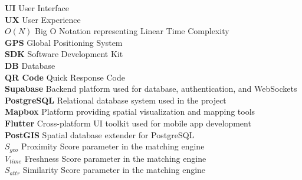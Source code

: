 \documentclass[12pt,a4paper]{report}
\begin{document}
\vspace{1cm}

\noindent
\textbf{UI} \hspace{2cm} User Interface \\[0.5cm]
\textbf{UX} \hspace{2cm} User Experience \\[0.5cm]
\textbf{$O(N)$} \hspace{1.5cm} Big O Notation representing Linear Time Complexity \\[0.5cm]
\textbf{GPS} \hspace{1.7cm} Global Positioning System \\[0.5cm]
\textbf{SDK} \hspace{1.7cm} Software Development Kit \\[0.5cm]
\textbf{DB} \hspace{2cm} Database \\[0.5cm]
\textbf{QR Code} \hspace{0.9cm} Quick Response Code \\[0.5cm]
\textbf{Supabase} \hspace{0.8cm} Backend platform used for database, authentication, and WebSockets \\[0.5cm]
\textbf{PostgreSQL} \hspace{0.4cm} Relational database system used in the project \\[0.5cm]
\textbf{Mapbox} \hspace{1.1cm} Platform providing spatial visualization and mapping tools \\[0.5cm]
\textbf{Flutter} \hspace{1.3cm} Cross-platform UI toolkit used for mobile app development \\[0.5cm]
\textbf{PostGIS} \hspace{1.2cm} Spatial database extender for PostgreSQL \\[0.5cm]
\textbf{$S_{geo}$} \hspace{1.7cm} Proximity Score parameter in the matching engine \\[0.5cm]
\textbf{$V_{time}$} \hspace{1.5cm} Freshness Score parameter in the matching engine \\[0.5cm]
\textbf{$S_{attr}$} \hspace{1.7cm} Similarity Score parameter in the matching engine

\newpage
\clearpage
{}
\end{document}
